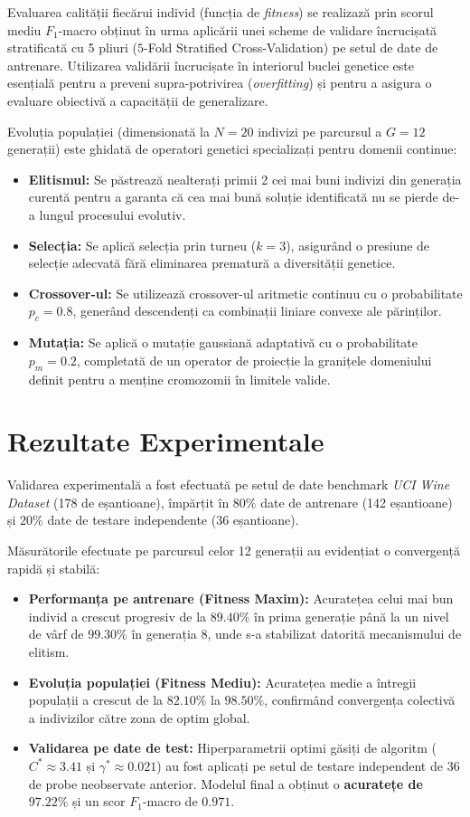 \documentclass[12pt,a4paper]{report}
\begin{document}
Evaluarea calității fiecărui individ (funcția de \textit{fitness}) se realizază prin scorul mediu $F_1$-macro obținut în urma aplicării unei scheme de validare încrucișată stratificată cu 5 pliuri ($5$-Fold Stratified Cross-Validation) pe setul de date de antrenare. Utilizarea validării încrucișate în interiorul buclei genetice este esențială pentru a preveni supra-potrivirea (\textit{overfitting}) și pentru a asigura o evaluare obiectivă a capacității de generalizare.

Evoluția populației (dimensionată la $N = 20$ indivizi pe parcursul a $G = 12$ generații) este ghidată de operatori genetici specializați pentru domenii continue:
\begin{itemize}
    \item \textbf{Elitismul:} Se păstrează nealterați primii 2 cei mai buni indivizi din generația curentă pentru a garanta că cea mai bună soluție identificată nu se pierde de-a lungul procesului evolutiv.
    \item \textbf{Selecția:} Se aplică selecția prin turneu ($k = 3$), asigurând o presiune de selecție adecvată fără eliminarea prematură a diversității genetice.
    \item \textbf{Crossover-ul:} Se utilizează crossover-ul aritmetic continuu cu o probabilitate $p_c = 0.8$, generând descendenți ca combinații liniare convexe ale părinților.
    \item \textbf{Mutația:} Se aplică o mutație gaussiană adaptativă cu o probabilitate $p_m = 0.2$, completată de un operator de proiecție la granițele domeniului definit pentru a menține cromozomii în limitele valide.
\end{itemize}

\section*{Rezultate Experimentale}
Validarea experimentală a fost efectuată pe setul de date benchmark \textit{UCI Wine Dataset} (178 de eșantioane), împărțit în $80\%$ date de antrenare (142 eșantioane) și $20\%$ date de testare independente (36 eșantioane). 

Măsurătorile efectuate pe parcursul celor 12 generații au evidențiat o convergență rapidă și stabilă:
\begin{itemize}
    \item \textbf{Performanța pe antrenare (Fitness Maxim):} Acuratețea celui mai bun individ a crescut progresiv de la $89.40\%$ în prima generație până la un nivel de vârf de \textbf{$99.30\%$} în generația 8, unde s-a stabilizat datorită mecanismului de elitism.
    \item \textbf{Evoluția populației (Fitness Mediu):} Acuratețea medie a întregii populații a crescut de la $82.10\%$ la \textbf{$98.50\%$}, confirmând convergența colectivă a indivizilor către zona de optim global.
    \item \textbf{Validarea pe date de test:} Hiperparametrii optimi găsiți de algoritm ($C^* \approx 3.41$ și $\gamma^* \approx 0.021$) au fost aplicați pe setul de testare independent de 36 de probe neobservate anterior. Modelul final a obținut o \textbf{acuratețe de $97.22\%$} și un scor $F_1$-macro de $0.971$.
\end{itemize}
\end{document}
